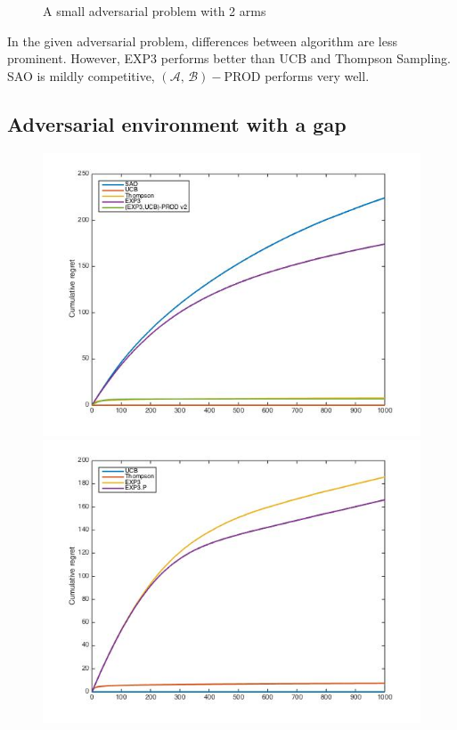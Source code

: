 \documentclass[10.5pt]{article}
\begin{document}
\begin{figure}[H]
  \label{fig:awesome_image3}
\endminipage
\caption{A small adversarial problem with 2 arms}
\end{figure}

In the given adversarial problem, differences between algorithm are less prominent. However, EXP3 performs better than UCB and Thompson Sampling. SAO is mildly competitive, $(\mathcal{A},\, \mathcal{B})-$PROD performs very well.

\subsection*{Adversarial environment with a gap}

\begin{figure}[H]
  \includegraphics[width=\linewidth]{Adv2_mix.jpg}
  \label{fig:awesome_image1}
\endminipage\hfill
{}
  \includegraphics[width=\linewidth]{Adv2_old.jpg}

\end{figure}
\end{document}
